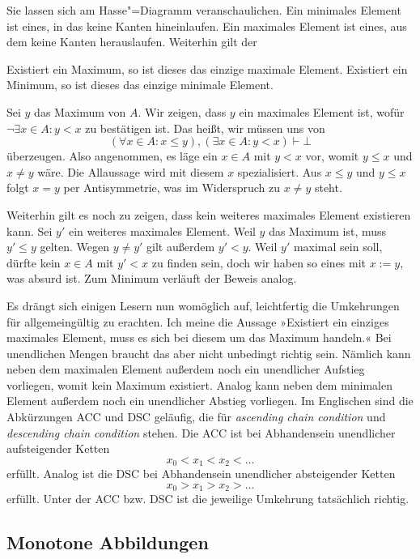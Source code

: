 \noindent
Sie lassen sich am Hasse"=Diagramm veranschaulichen. Ein minimales
Element ist eines, in das keine Kanten hineinlaufen. Ein maximales
Element ist eines, aus dem keine Kanten herauslaufen. Weiterhin
gilt der

\begin{Satz}
Existiert ein Maximum, so ist dieses das einzige maximale Element.
Existiert ein Minimum, so ist dieses das einzige minimale Element.
\end{Satz}
\begin{Beweis}
Sei $y$ das Maximum von $A$. Wir zeigen, dass $y$ ein maximales
Element ist, wofür $\lnot\exists x\in A\colon y<x$ zu bestätigen ist.
Das heißt, wir müssen uns von
\[(\forall x\in A\colon x\le y),(\exists x\in A\colon y<x)\vdash\bot\]
überzeugen. Also angenommen, es läge ein $x\in A$ mit $y<x$ vor, womit
$y\le x$ und $x\ne y$ wäre. Die Allaussage wird mit diesem $x$
spezialisiert. Aus $x\le y$ und $y\le x$ folgt $x=y$ per Antisymmetrie,
was im Widerspruch zu $x\ne y$ steht.

Weiterhin gilt es noch zu zeigen, dass kein weiteres maximales
Element existieren kann. Sei $y'$ ein weiteres maximales Element.
Weil $y$ das Maximum ist, muss $y'\le y$ gelten. Wegen $y\ne y'$
gilt außerdem $y'<y$. Weil $y'$ maximal sein soll, dürfte kein $x\in A$
mit $y'<x$ zu finden sein, doch wir haben so eines mit $x:=y$, was
absurd ist. Zum Minimum verläuft der Beweis analog.\,\qedsymbol
\end{Beweis}

\noindent
Es drängt sich einigen Lesern nun womöglich auf, leichtfertig die
Umkehrungen für allgemeingültig zu erachten. Ich meine die Aussage
»Existiert ein einziges maximales Element, muss es sich bei diesem um
das Maximum handeln.« Bei unendlichen Mengen braucht das aber nicht
unbedingt richtig sein. Nämlich kann neben dem maximalen Element
außerdem noch ein unendlicher Aufstieg vorliegen, womit kein
Maximum existiert. Analog kann neben dem minimalen Element außerdem
noch ein unendlicher Abstieg vorliegen. Im Englischen sind die
Abkürzungen ACC und DSC geläufig, die für \emph{ascending chain condition}
und \emph{descending chain condition} stehen. Die ACC ist bei
Abhandensein unendlicher aufsteigender Ketten
\[x_0<x_1<x_2<\ldots\]
erfüllt. Analog ist die DSC bei Abhandensein unendlicher absteigender
Ketten
\[x_0>x_1>x_2>\ldots\]
erfüllt. Unter der ACC bzw. DSC ist die jeweilige Umkehrung tatsächlich
richtig.

\subsection{Monotone Abbildungen}

